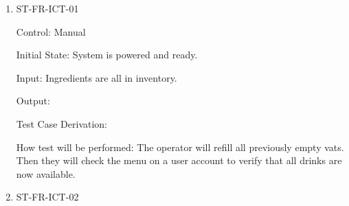 \documentclass[12pt, titlepage]{article}
\begin{document}
\begin{enumerate}


					
					
					

					
					
\item{ST-FR-ICT-01\\}

Control: Manual

Initial State: System is powered and ready.

Input: Ingredients are all in inventory.

Output: 

Test Case Derivation: 

How test will be performed: The operator will refill all previously empty vats. Then they will check the menu on a user account to verify that all drinks are now available. 

\item{ST-FR-ICT-02\\}


\end{enumerate}
\end{document}
